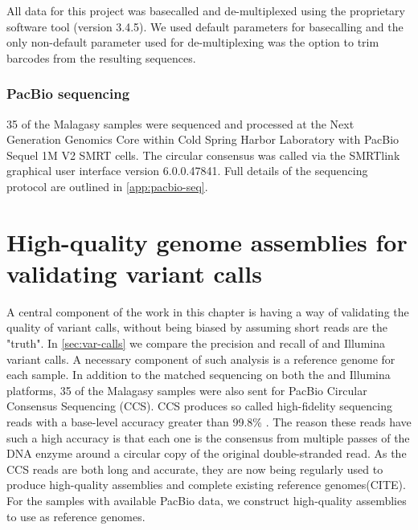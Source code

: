 
All \ont{} data for this project was basecalled and de-multiplexed using the \ont{} proprietary software tool \guppy{} (version 3.4.5). We used default parameters for basecalling and the only non-default parameter used for de-multiplexing was the option to trim barcodes from the resulting sequences.  

\subsubsection{PacBio sequencing}
35 of the Malagasy samples were sequenced and processed at the Next Generation Genomics Core within Cold Spring Harbor Laboratory with PacBio Sequel 1M V2 SMRT cells. The circular consensus was called via the SMRTlink graphical user interface version 6.0.0.47841. Full details of the sequencing protocol are outlined in \autoref{app:pacbio-seq}.


\section{High-quality genome assemblies for validating variant calls}
\label{sec:asm_results}
A central component of the work in this chapter is having a way of validating the quality of variant calls, without being biased by assuming short reads are the "truth". In \autoref{sec:var-calls} we compare the precision and recall of \ont{} and Illumina variant calls. A necessary component of such analysis is a reference genome for each sample. In addition to the matched sequencing on both the \ont{} and Illumina platforms, 35 of the Malagasy samples were also sent for PacBio Circular Consensus Sequencing (CCS). CCS produces so called high-fidelity sequencing reads with a base-level accuracy greater than 99.8\% \cite{wenger2019}. The reason these reads have such a high accuracy is that each one is the consensus from multiple passes of the DNA enzyme around a circular copy of the original double-stranded read. As the CCS reads are both long and accurate, they are now being regularly used to produce high-quality \denovo{} assemblies and complete existing reference genomes(CITE). 
For the samples with available PacBio data, we construct high-quality assemblies to use as reference genomes.

